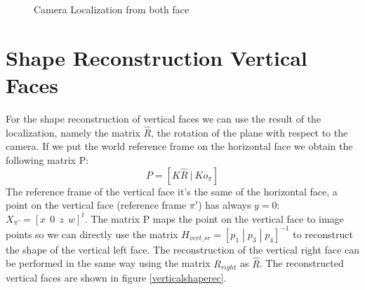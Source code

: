 \documentclass[11pt, oneside]{article}   	%
\begin{document}
\begin{figure}[H] 
 \centering
    \qquad
      \qquad
    \caption{Camera Localization from both face}%
    \label{general_loc}%
\end{figure}

\section{Shape Reconstruction Vertical Faces }
For the shape reconstruction of vertical faces we can use the result of the localization, namely the matrix $\hat{R}$, the rotation of the plane with respect to the camera.
If we put the world reference frame on the horizontal face we obtain the following matrix P:
$$ P = [K \hat{R} \  | \ K o_\pi ] $$
The reference frame of the vertical face it's the same of the horizontal face, a point on the vertical face (reference frame $\pi'$) has always $y=0$: $X_{\pi'} = [x \ \ 0 \ \ z \ \  w]^t$.
The matrix P maps the point on the vertical face to image points so we can directly use the matrix $ H_{vert\_sr} = [p_1 \; |\; p_3 \;|\; p_4]^{-1}$ to reconstruct the shape of the vertical left face.
The reconstruction of the vertical right face can be performed in the same way using the matrix $R_{right}$ as $\hat{R}$.
The reconstructed  vertical faces are shown in figure \ref{verticalshaperec}.
\end{document}
